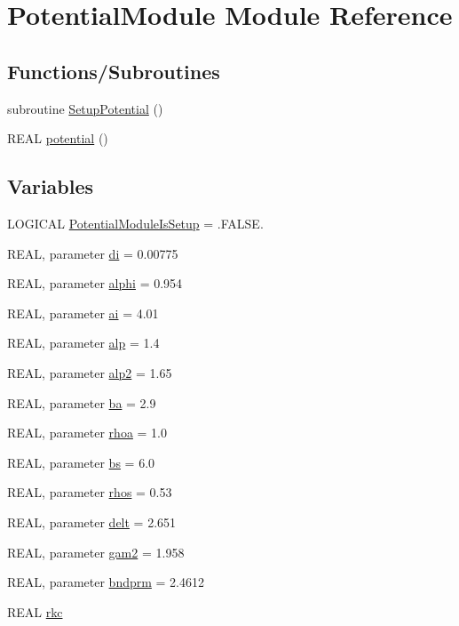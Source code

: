 \hypertarget{namespace_potential_module}{
\section{PotentialModule Module Reference}
\label{namespace_potential_module}
}
\subsection*{Functions/Subroutines}
\begin{DoxyCompactItemize}
\item 
subroutine \hyperlink{namespace_potential_module_a0c5361b39413bf95854a08097d55a022}{SetupPotential} ()
\item 
REAL \hyperlink{namespace_potential_module_afce25724f08bbb54ef8f643edb2650e2}{potential} ()
\end{DoxyCompactItemize}
\subsection*{Variables}
\begin{DoxyCompactItemize}
\item 
LOGICAL \hyperlink{namespace_potential_module_a56b866590823c5b1d9c82b7aa77daf9e}{PotentialModuleIsSetup} = .FALSE.
\item 
REAL, parameter \hyperlink{namespace_potential_module_a0da530bc0742919bd0e53de92f6e02fa}{di} = 0.00775
\item 
REAL, parameter \hyperlink{namespace_potential_module_ad9531fa451a7ae33ff2d7c264831bbd3}{alphi} = 0.954
\item 
REAL, parameter \hyperlink{namespace_potential_module_a5c9cc4bf368687b35bb242530da5756a}{ai} = 4.01
\item 
REAL, parameter \hyperlink{namespace_potential_module_aa93c85860f19c102f0310f46e0ee9aea}{alp} = 1.4
\item 
REAL, parameter \hyperlink{namespace_potential_module_af866bbb2550dbe0c5b8f5b17f678ef6b}{alp2} = 1.65
\item 
REAL, parameter \hyperlink{namespace_potential_module_a199e6aa4930d0d691b3ac82df545fc6a}{ba} = 2.9
\item 
REAL, parameter \hyperlink{namespace_potential_module_a8fa7bfea18883c3caf65075c95ed1bd2}{rhoa} = 1.0
\item 
REAL, parameter \hyperlink{namespace_potential_module_ae5ccd9c3015518c7370080c3c74d985f}{bs} = 6.0
\item 
REAL, parameter \hyperlink{namespace_potential_module_a7585ccecd1db834861fbeb7b4113fd00}{rhos} = 0.53
\item 
REAL, parameter \hyperlink{namespace_potential_module_a19c3989862133abb6235ae587fe8b229}{delt} = 2.651
\item 
REAL, parameter \hyperlink{namespace_potential_module_a405bc5381d283c3cd58d018d03e83017}{gam2} = 1.958
\item 
REAL, parameter \hyperlink{namespace_potential_module_a35408fb0f2283fa2417890b7aef4f054}{bndprm} = 2.4612
\item 
REAL \hyperlink{namespace_potential_module_a4924d732b6124ef59e9b15aaf63a7160}{rkc}
\end{DoxyCompactItemize}


